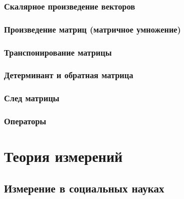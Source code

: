 \documentclass[
  letterpaper,
  DIV=11,
  numbers=noendperiod]{scrreprt}
\theoremstyle{definition}
\theoremstyle{remark}
\begin{document}
\section{Скалярное произведение
векторов}\label{ux441ux43aux430ux43bux44fux440ux43dux43eux435-ux43fux440ux43eux438ux437ux432ux435ux434ux435ux43dux438ux435-ux432ux435ux43aux442ux43eux440ux43eux432}

\section{Произведение матриц (матричное
умножение)}\label{ux43fux440ux43eux438ux437ux432ux435ux434ux435ux43dux438ux435-ux43cux430ux442ux440ux438ux446-ux43cux430ux442ux440ux438ux447ux43dux43eux435-ux443ux43cux43dux43eux436ux435ux43dux438ux435}

\section{Транспонирование
матрицы}\label{ux442ux440ux430ux43dux441ux43fux43eux43dux438ux440ux43eux432ux430ux43dux438ux435-ux43cux430ux442ux440ux438ux446ux44b}

\section{Детерминант и обратная
матрица}\label{ux434ux435ux442ux435ux440ux43cux438ux43dux430ux43dux442-ux438-ux43eux431ux440ux430ux442ux43dux430ux44f-ux43cux430ux442ux440ux438ux446ux430}

\section{След
матрицы}\label{ux441ux43bux435ux434-ux43cux430ux442ux440ux438ux446ux44b}

\section{Операторы}\label{ux43eux43fux435ux440ux430ux442ux43eux440ux44b}

\part{Теория измерений}


\chapter{Измерение в социальных
науках}\label{ux438ux437ux43cux435ux440ux435ux43dux438ux435-ux432-ux441ux43eux446ux438ux430ux43bux44cux43dux44bux445-ux43dux430ux443ux43aux430ux445}
\end{document}
